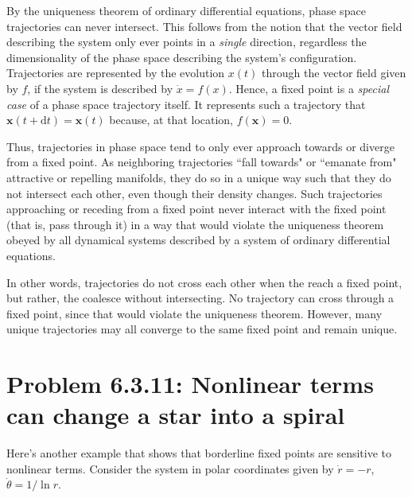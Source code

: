 \documentclass[draft]{agujournal2019}
\begin{document}





By the uniqueness theorem of ordinary differential equations, phase space trajectories can never intersect. This follows from the notion that the vector field describing the system only ever points in a \emph{single} direction, regardless the dimensionality of the phase space describing the system's configuration. Trajectories are represented by the evolution $x(t)$ through the vector field given by $f$, if the system is described by $\dot x = f(x)$. Hence, a fixed point is a \emph{special case} of a phase space trajectory itself. It represents such a trajectory that $\mathbf{x}(t+\mathrm{d}t) = \mathbf x(t)$ because, at that location, $f(\mathbf x)=0$. 
\par

Thus, trajectories in phase space tend to only ever approach towards or diverge from a fixed point. As neighboring trajectories ``fall towards" or ``emanate from" attractive or repelling manifolds, they do so in a unique way such that they do not intersect each other, even though their density changes. Such trajectories approaching or receding from a fixed point never interact with the fixed point (that is, pass through it) in a way that would violate the uniqueness theorem obeyed by all dynamical systems described by a system of ordinary differential equations. 
\par

In other words, trajectories do not cross each other when the reach a fixed point, but rather, the coalesce without intersecting. No trajectory can cross through a fixed point, since that would violate the uniqueness theorem. However, many unique trajectories may all converge to the same fixed point and remain unique. 





\section{Problem 6.3.11: Nonlinear terms can change a star into a spiral}
\label{sec:p6}
Here’s another example that shows that borderline fixed points are sensitive to nonlinear terms. Consider the system in polar coordinates given by $\dot r = -r$, $\dot \theta = 1/\ln{r}$.
\end{document}
